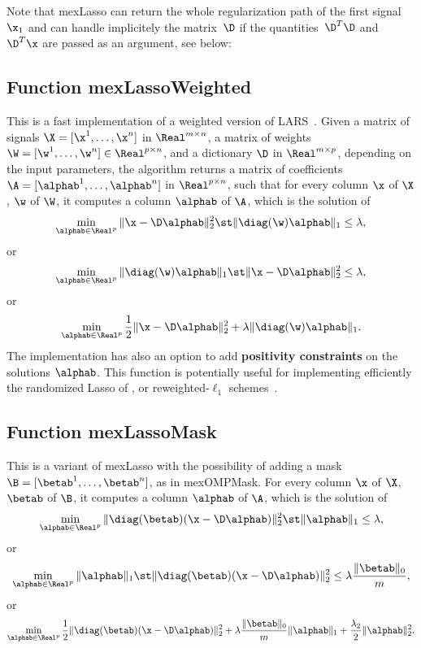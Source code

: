 \documentclass[a4paper, 11pt]{article}
\begin{document}
Note that mexLasso can return the whole regularization path of the first signal $\x_1$ 
and can handle implicitely the matrix~$\D$ if the quantities~$\D^T\D$ and~$\D^T\x$ are passed
as an argument, see below:

{\footnotesize

}

\subsection{Function mexLassoWeighted}
This is a fast implementation of a weighted version of LARS~\cite{efron}. Given a matrix of signals $\X=[\x^1,\ldots,\x^n]$  in $\Real^{m \times n}$, a matrix of weights $\W=[\w^1,\ldots,\w^n] \in \Real^{p \times n}$, and a dictionary $\D$ in $\Real^{m \times p}$, depending on the input parameters, the algorithm returns a matrix of coefficients $\A=[\alphab^1,\ldots,\alphab^n]$ in $\Real^{p \times n}$,
such that for every column $\x$ of $\X$, $\w$ of $\W$, it computes a column $\alphab$ of $\A$,  which is the solution of
\begin{equation}
   \min_{\alphab \in \Real^p} \|\x-\D\alphab\|_2^2 \st \|\diag(\w)\alphab\|_1 \leq \lambda,
\end{equation}
or 
\begin{equation}
   \min_{\alphab \in \Real^p}  \|\diag(\w)\alphab\|_1 \st \|\x-\D\alphab\|_2^2 \leq \lambda,
\end{equation}
or
\begin{equation}
   \min_{\alphab \in \Real^p} \frac{1}{2}\|\x-\D\alphab\|_2^2 + \lambda \|\diag(\w)\alphab\|_1.
\end{equation}
The implementation has also an option to add {\bf positivity constraints} on
the solutions $\alphab$.  This function is potentially useful for
implementing efficiently the randomized Lasso of \cite{meinshausen}, or reweighted-$\ell_1$ schemes~\cite{candes4}.

{\footnotesize

}

\subsection{Function mexLassoMask}
This is a variant of mexLasso with the possibility of adding a mask $\B=[\betab^1,\ldots,\betab^n]$, as in mexOMPMask. 
For every column $\x$ of $\X$, $\betab$ of $\B$, it computes a column $\alphab$ of $\A$,  which is the solution of
\begin{equation}
   \min_{\alphab \in \Real^p} \|\diag(\betab)(\x-\D\alphab)\|_2^2 \st \|\alphab\|_1 \leq \lambda,
\end{equation}
or 
\begin{equation}
   \min_{\alphab \in \Real^p}  \|\alphab\|_1 \st \|\diag(\betab)(\x-\D\alphab)\|_2^2 \leq \lambda\frac{\|\betab\|_0}{m}, 
\end{equation}
or
\begin{equation}
   \min_{\alphab \in \Real^p} \frac{1}{2}\|\diag(\betab)(\x-\D\alphab)\|_2^2 + \lambda \frac{\|\betab\|_0}{m}\|\alphab\|_1 + \frac{\lambda_2}{2}\|\alphab\|_2^2. 
\end{equation}
\end{document}
